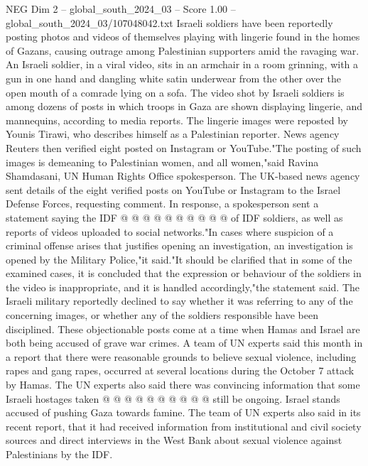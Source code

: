\begin{textsample}{NEG Dim 2 – global\_south\_2024\_03 – Score 1.00 – global\_south\_2024\_03/107048042.txt}  \label{ex:f2_neg_432}
Israeli soldiers have been reportedly posting photos and videos of themselves playing with lingerie found in the homes of Gazans, causing outrage among Palestinian supporters amid the ravaging war.
An Israeli soldier, in a viral video, sits in an armchair in a room grinning, with a gun in one hand and dangling white satin underwear from the other over the open mouth of a comrade lying on a sofa.
The video shot by Israeli soldiers is among dozens of posts in which troops in Gaza are shown displaying lingerie, and mannequins, according to media reports.
The lingerie images were reposted by Younis Tirawi, who describes himself as a Palestinian reporter.
News agency Reuters then verified eight posted on Instagram or YouTube."The posting of such images is demeaning to Palestinian women, and all women,"said Ravina Shamdasani, UN Human Rights Office spokesperson.
The UK-based news agency sent details of the eight verified posts on YouTube or Instagram to the Israel Defense Forces, requesting comment.
In response, a spokesperson sent a statement saying the IDF @ @ @ @ @ @ @ @ @ @ of IDF soldiers, as well as reports of videos uploaded to social networks."In cases where suspicion of a criminal offense arises that justifies opening an investigation, an investigation is opened by the Military Police,"it said."It should be clarified that in some of the examined cases, it is concluded that the expression or behaviour of the soldiers in the video is inappropriate, and it is handled accordingly,"the statement said.
The Israeli military reportedly declined to say whether it was referring to any of the concerning images, or whether any of the soldiers responsible have been disciplined.
These objectionable posts come at a time when Hamas and Israel are both being accused of grave war crimes.
A team of UN experts said this month in a report that there were reasonable grounds to believe sexual violence, including rapes and gang rapes, occurred at several locations during the October 7 attack by Hamas.
The UN experts also said there was convincing information that some Israeli hostages taken @ @ @ @ @ @ @ @ @ @ still be ongoing.
Israel stands accused of pushing Gaza towards famine.
The team of UN experts also said in its recent report, that it had received information from institutional and civil society sources and direct interviews in the West Bank about sexual violence against Palestinians by the IDF.

\end{textsample}
